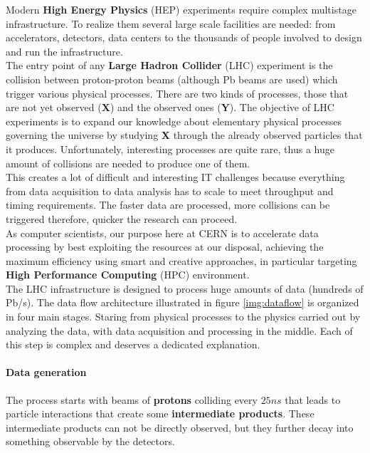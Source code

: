 Modern \textbf{High Energy Physics} (HEP) experiments require complex multistage infrastructure. To realize them several large scale facilities are needed: from accelerators, detectors, data centers to the thousands of people involved to design and run the infrastructure.\\
The entry point of any \textbf{Large Hadron Collider} (LHC) experiment is the collision between proton-proton beams (although Pb beams are used) which trigger various physical processes. There are two kinds of processes, those that are not yet observed (\textbf{X}) and the observed ones (\textbf{Y}). The objective of LHC experiments is to expand our knowledge about elementary physical processes governing the universe by studying \textbf{X} through the already observed particles that it produces. Unfortunately, interesting processes are quite rare, thus a huge amount of collisions are needed to produce one of them.\\
This creates a lot of difficult and interesting IT challenges because everything from data acquisition to data analysis has to scale to meet throughput and timing requirements. The faster data are processed, more collisions can be triggered therefore, quicker the research can proceed.\\
As computer scientists, our purpose here at CERN is to accelerate data processing by best exploiting the resources at our disposal, achieving the maximum efficiency using smart and creative approaches, in particular targeting \textbf{High Performance Computing} (HPC) environment. \\
The LHC infrastructure is designed to process huge amounts of data (hundreds of Pb/s). The data flow architecture illustrated in figure \ref{img:dataflow} is organized in four main stages. Staring from physical processes to the physics carried out by analyzing the data, with data acquisition and processing in the middle. Each of this step is complex and deserves a dedicated explanation. 
\paragraph{Data generation}
The process starts with beams of \textbf{protons} colliding every $25ns$ that leads to particle interactions that create some \textbf{intermediate products}. These intermediate products can not be directly observed, but they further decay into something observable by the detectors.
